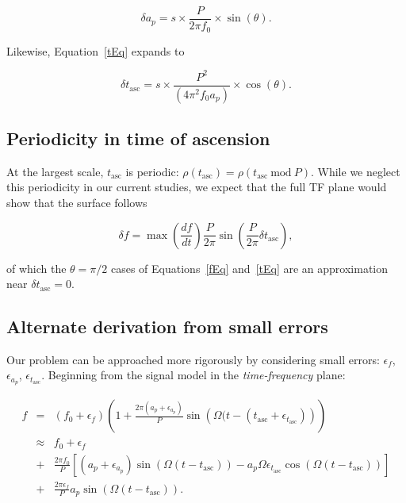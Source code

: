 \documentclass{article}
\begin{document}
\begin{equation}
\delta a_p= s \times \frac{P}{2 \pi f_0} \times \sin(\theta).
\label{aEqFull}
\end{equation}

Likewise, Equation~\ref{tEq} expands to

\begin{equation}
\delta t_\mathrm{asc}    = s \times \frac{P^2}{(4 \pi^2 f_0 a_p)} \times \cos(\theta).
\label{tEqFull}
\end{equation}

\subsection{Periodicity in time of ascension}


At the largest scale, $t_\mathrm{asc}$ is periodic: $\rho(t_\mathrm{asc}) = \rho(t_\mathrm{asc} \mathrm{~mod~} P)$.
While we neglect this periodicity in our current studies, we expect that the full TF plane would show that the surface follows

\begin{equation}
\delta f = \max \left(\frac{df}{dt} \right) \frac{P}{2 \pi} \sin \left(\frac{P}{2 \pi} \delta t_\mathrm{asc} \right),
\end{equation}

\noindent of which the $\theta = \pi/2$ cases of Equations~\ref{fEq} and~\ref{tEq} are an approximation near $\delta t_\mathrm{asc} =0$.

\subsection{Alternate derivation from small errors}

Our problem can be approached more rigorously by considering small errors: $\epsilon_f$, $\epsilon_{a_p}$, $\epsilon_{t_\mathrm{asc}}$.
Beginning from the signal model in the \textit{time-frequency} plane:


\begin{eqnarray}
f & = & \left(f_0 + \epsilon_f\right) \left( 1 + \frac{2 \pi (a_p + \epsilon_{a_p})}{P}\sin \left(\Omega (t - (t_\mathrm{asc}+\epsilon_{t_\mathrm{asc}}) \right) \right)\\
                   & \approx & f_0 + \epsilon_f \nonumber \\
                   &+& \frac{2\pi f_0}{P} \left[
                     (a_p+\epsilon_{a_p}) \sin(\Omega(t-t_\mathrm{asc}))
                   - a_p \Omega \epsilon_{t_\mathrm{asc}} \cos(\Omega(t-t_\mathrm{asc})) \right]  \nonumber \\
                   &+& \frac{2 \pi \epsilon_f}{P}  a_p  \sin(\Omega ( t-t_\mathrm{asc})).
\end{eqnarray}
\end{document}
